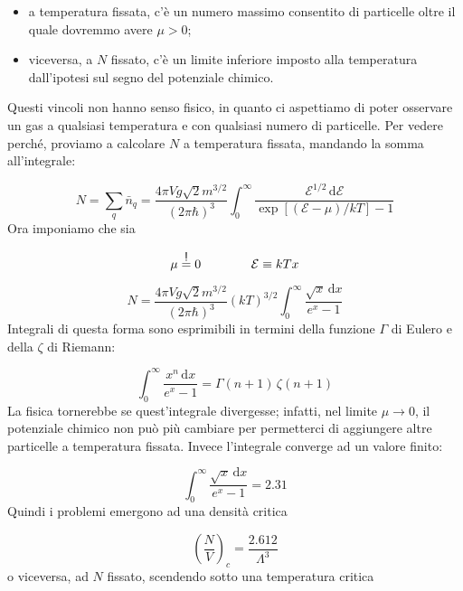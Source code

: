\documentclass[a4paper]{report}
\newcommand\impongo{\mathrel{\overset{\makebox[0pt]{\mbox{\normalfont\sffamily !}}}{=}}}
\begin{document}
\begin{itemize}
    \item a temperatura fissata, c'è un numero massimo consentito di particelle oltre il quale dovremmo avere $\mu > 0$;
    \item viceversa, a $N$ fissato, c'è un limite inferiore imposto alla temperatura dall'ipotesi sul segno del potenziale chimico.
\end{itemize}
Questi vincoli non hanno senso fisico, in quanto ci aspettiamo di poter osservare un gas a qualsiasi temperatura e con qualsiasi numero di particelle. Per vedere perché, proviamo a calcolare $N$ a temperatura fissata, mandando la somma all'integrale:

\begin{equation}
    N = \sum_q \bar{n}_q
    = \frac{4\pi V g \sqrt 2 m^{3/2}}{(2 \pi \hbar)^3} \int_{0}^{\infty} \frac{\mathcal{E}^{1/2}\,\mathrm{d}\mathcal{E}} {\exp [(\mathcal{E}-\mu)/ k T] - 1}
\end{equation}
Ora imponiamo che sia

\begin{equation}
    \mu \impongo 0 \qquad \qquad\mathcal{E} \equiv k T x
\end{equation}

\begin{equation}
    N = \frac{4\pi V g \sqrt 2 m^{3/2}}{(2 \pi \hbar)^3} (k T)^{3/2} \int_{0}^{\infty} \frac{\sqrt{x}\,\mathrm{d}x} {e^x - 1}
\end{equation}
Integrali di questa forma sono esprimibili in termini della funzione $\Gamma$ di Eulero e della $\zeta$ di Riemann:

\begin{equation}
    \int_{0}^{\infty} \frac{x^n\,\mathrm{d}x} {e^x - 1} = \Gamma(n+1)\,\zeta(n+1)
\end{equation}
La fisica tornerebbe se quest'integrale divergesse; infatti, nel limite $\mu \to 0$, il potenziale chimico non può più cambiare per permetterci di aggiungere altre particelle a temperatura fissata. Invece l'integrale converge ad un valore finito:

\begin{equation}
    \int_{0}^{\infty} \frac{\sqrt{x}\,\mathrm{d}x} {e^x - 1} = 2.31
\end{equation}
Quindi i problemi emergono ad una densità critica

\begin{equation}
   \left(\frac{N}{V}\right)_c = \frac{2.612}{\Lambda^3} 
\end{equation}
o viceversa, ad $N$ fissato, scendendo sotto una temperatura critica
\end{document}
